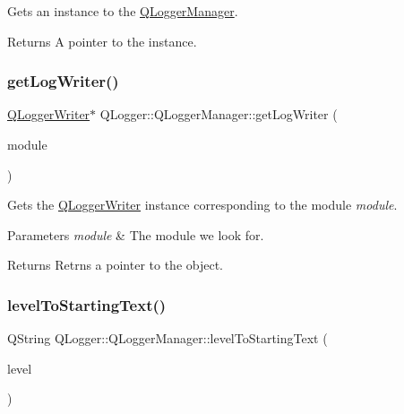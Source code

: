 Gets an instance to the \mbox{\hyperlink{class_q_logger_1_1_q_logger_manager}{Q\+Logger\+Manager}}. 

\begin{DoxyReturn}{Returns}
A pointer to the instance. 
\end{DoxyReturn}
\mbox{\label{class_q_logger_1_1_q_logger_manager_ae0f85687fdbcd17760c38f5b31a61cc9}} 
\subsubsection{\texorpdfstring{getLogWriter()}{getLogWriter()}}
{\footnotesize\ttfamily \mbox{\hyperlink{class_q_logger_1_1_q_logger_writer}{Q\+Logger\+Writer}}$\ast$ Q\+Logger\+::\+Q\+Logger\+Manager\+::get\+Log\+Writer (\begin{DoxyParamCaption}\item[{const Q\+String \&}]{module }\end{DoxyParamCaption})\hspace{0.3cm}{\ttfamily [inline]}}



Gets the \mbox{\hyperlink{class_q_logger_1_1_q_logger_writer}{Q\+Logger\+Writer}} instance corresponding to the module {\itshape module}. 


\begin{DoxyParams}{Parameters}
{\em module} & The module we look for. \\
\hline
\end{DoxyParams}
\begin{DoxyReturn}{Returns}
Retrns a pointer to the object. 
\end{DoxyReturn}
\mbox{\label{class_q_logger_1_1_q_logger_manager_ab52ab18b57d37af78cbeec50b31b790f}} 
\subsubsection{\texorpdfstring{levelToStartingText()}{levelToStartingText()}}
{\footnotesize\ttfamily Q\+String Q\+Logger\+::\+Q\+Logger\+Manager\+::level\+To\+Starting\+Text (\begin{DoxyParamCaption}\item[{const Log\+Level \&}]{level }\end{DoxyParamCaption})\hspace{0.3cm}{\ttfamily [static]}}



